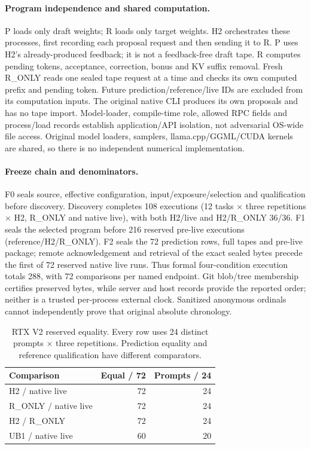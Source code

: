 \paragraph{Program independence and shared computation.}
P loads only draft weights; R loads only target weights. H2 orchestrates these processes, first recording each proposal request and then sending it to R. P uses H2's already-produced feedback; it is not a feedback-free draft tape. R computes pending tokens, acceptance, correction, bonus and KV suffix removal. Fresh R\_ONLY reads one sealed tape request at a time and checks its own computed prefix and pending token. Future prediction/reference/live IDs are excluded from its computation inputs. The original native CLI produces its own proposals and has no tape import. Model-loader, compile-time role, allowed RPC fields and process/load records establish application/API isolation, not adversarial OS-wide file access. Original model loaders, samplers, llama.cpp/GGML/CUDA kernels are shared, so there is no independent numerical implementation.

\paragraph{Freeze chain and denominators.}
F0 seals source, effective configuration, input/exposure/selection and qualification before discovery. Discovery completes 108 executions (12 tasks $\times$ three repetitions $\times$ H2, R\_ONLY and native live), with both H2/live and H2/R\_ONLY 36/36. F1 seals the selected program before 216 reserved pre-live executions (reference/H2/R\_ONLY). F2 seals the 72 prediction rows, full tapes and pre-live package; remote acknowledgement and retrieval of the exact sealed bytes precede the first of 72 reserved native live runs. Thus formal four-condition execution totals 288, with 72 comparisons per named endpoint. Git blob/tree membership certifies preserved bytes, while server and host records provide the reported order; neither is a trusted per-process external clock. Sanitized anonymous ordinals cannot independently prove that original absolute chronology.

\begin{table}[t]
\caption{RTX V2 reserved equality. Every row uses 24 distinct prompts $\times$ three repetitions. Prediction equality and reference qualification have different comparators.}
\label{tab:rtxreplay}
\centering
\begin{tabular}{lrr}
\toprule
Comparison & Equal / 72 & Prompts / 24 \\
\midrule
H2 / native live & 72 & 24 \\
R\_ONLY / native live & 72 & 24 \\
H2 / R\_ONLY & 72 & 24 \\
UB1 / native live & 60 & 20 \\
\bottomrule
\end{tabular}
\end{table}


